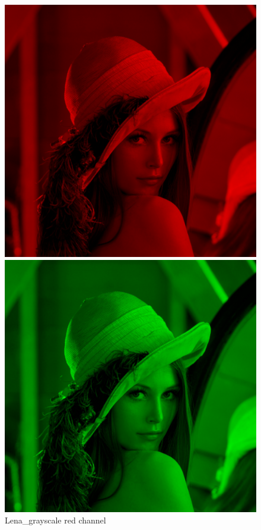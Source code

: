 \begin{figure}[h]
	\centering
	\begin{minipage}{0.45\textwidth}
		\centering
		\includegraphics[width=\linewidth]{images/source/task4/2/1}
		\caption{Lena\_grayscale red channel}
		\label{fig:1a}
        \end{minipage}
        \hspace{0.05\textwidth}
        \begin{minipage}{0.45\textwidth}
        		\centering
		\includegraphics[width=\linewidth]{images/source/task4/2/2}

\end{minipage}
\end{figure}
